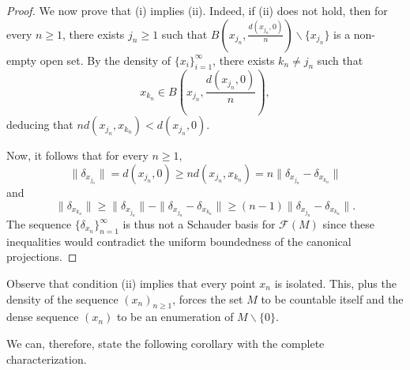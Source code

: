\documentclass[12pt,english]{amsart}
\numberwithin{equation}{section}
\theoremstyle{plain}
\theoremstyle{definition}
\begin{document}
\begin{proof}
We now prove that (i) implies (ii). Indeed, if (ii) does not hold, then for every $n\geq 1$, there exists $j_n\ge 1$ such that $B(x_{j_n},\frac{d(x_{j_n},0)}{n})\backslash\{x_{j_n}\}$ is a non-empty open set. By the density of $\{x_i\}_{i=1}^\infty$, there exists $k_n\ne j_n$ such that
\[x_{k_n}\in B\left(x_{j_n},\frac{d(x_{j_n},0)}{n}\right),\]
deducing that $nd(x_{j_n},x_{k_n})<d(x_{j_n},0).$


Now, it follows that for every $n\geq 1$, 
\[\|\delta_{x_{j_n}}\|=d(x_{j_n},0)\ge n d(x_{j_n},x_{k_n}) = n \|\delta_{x_{j_n}}-\delta_{x_{k_n}}\|\]
and
\[\|\delta_{x_{k_n}}\|\ge \|\delta_{x_{j_n}}\|- \|\delta_{x_{j_n}}-\delta_{x_{k_n}}\|\ge (n-1)\|\delta_{x_{j_n}}-\delta_{x_{k_n}}\|.\]
The sequence $\{\delta_{x_n}\}_{n=1}^\infty$ is thus not a Schauder basis for $\mathcal{F}(M)$ since these inequalities would contradict the uniform boundedness of the canonical projections.
\end{proof}

Observe that condition (ii) implies that every point $x_n$ is isolated. This, plus the density of the sequence $(x_n)_{n\ge 1}$, forces the set $M$ to be countable itself and the dense sequence $(x_n)$ to be an enumeration of $M\backslash\{0\}$. 






We can, therefore, state the following corollary with the complete characterization.
\end{document}
